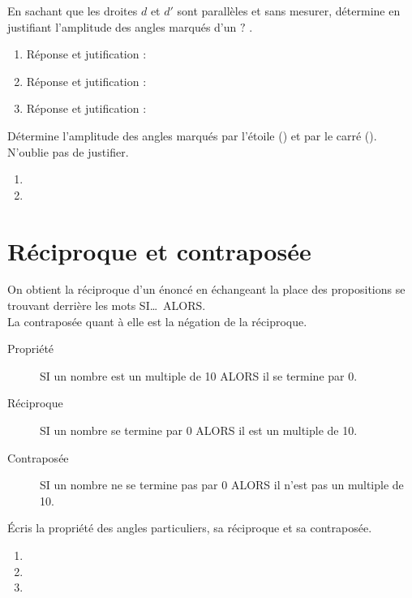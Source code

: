 \documentclass[../math2.tex]{subfiles}
\begin{document}
\begin{exercise}
    En sachant que les droites $d$ et $d'$ sont parallèles et sans mesurer, détermine en justifiant l'amplitude des angles marqués d'un \og $?$ \fg.
    \begin{enumerate}[itemsep=3cm]
        \item \makebox[.5\linewidth]{} Réponse et jutification :
        \item \makebox[.5\linewidth]{} Réponse et jutification :
        \item \makebox[.5\linewidth]{} Réponse et jutification :
    \end{enumerate}
\end{exercise}
\newpage
\begin{exercise}
    Détermine l'amplitude des angles marqués par l'étoile () et par le carré (). N'oublie pas de justifier.
    \begin{enumerate}[cols=2]
        \item 
        \vfill
        \item
        
    \end{enumerate}
    \vspace*{7cm}
\end{exercise}

\section{Réciproque et contraposée}
On obtient la réciproque d'un énoncé en échangeant la place des propositions se trouvant derrière les mots SI\dots\ ALORS.\\
La contraposée quant à elle est la négation de la réciproque.

\exemple 
\begin{description}
    \item[Propriété] SI un nombre est un multiple de 10 ALORS il se termine par 0.
    \item[Réciproque] SI un nombre se termine par 0 ALORS  il est un multiple de 10.
    \item[Contraposée] SI un nombre ne se termine pas par 0 ALORS il n'est pas un multiple de 10.
\end{description}

\begin{exercise}
    Écris la propriété des angles particuliers, sa réciproque et sa contraposée.
    \begin{enumerate}[label=]
            \item{}
            \item{}
            \item{}
    \end{enumerate}
\end{exercise}
\end{document}
